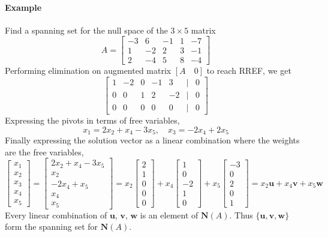 \documentclass[../linear-algebra.tex]{subfiles}
\begin{document}
\paragraph{Example}
Find a spanning set for the null space of the $3 \times 5$ matrix
\[A = \begin{bmatrix} -3 & 6 & -1 & 1 & -7 \\ 1 & -2 & 2 & 3 & -1 \\ 2 & -4 & 5 & 8 & -4 \end{bmatrix}\]
Performing elimination on augmented matrix $[A \quad 0]$ to reach RREF, we get
\[\begin{bmatrix} 1 & -2 & 0 & -1 & 3 & \big| & 0 \\ 0 & 0 & 1 & 2 & -2 & \big| & 0 \\ 0 & 0 & 0 & 0 & 0 & \big| & 0 \end{bmatrix}\]
Expressing the pivots in terms of free variables,
\[x_1 = 2x_2 + x_4 - 3x_5, \quad x_3 = -2x_4 + 2x_5\]
Finally expressing the solution vector as a linear combination where the weights are the free variables,
\[\begin{bmatrix} x_1 \\ x_2 \\ x_3 \\ x_4 \\ x_5 \end{bmatrix} = \begin{bmatrix} 2x_2 + x_4 - 3x_5 \\ x_2 \\ -2x_4 + x_5 \\ x_4 \\ x_5 \end{bmatrix} = x_2 \begin{bmatrix} 2 \\ 1 \\ 0 \\ 0 \\ 0 \end{bmatrix} + x_4 \begin{bmatrix} 1 \\ 0 \\ -2 \\ 1 \\ 0 \end{bmatrix} + x_5 \begin{bmatrix} -3 \\ 0 \\ 2 \\ 0 \\ 1 \end{bmatrix} = x_2\mathbf{u} + x_4\mathbf{v} + x_5\mathbf{w}\]
Every linear combination of $\mathbf{u}$, $\mathbf{v}$, $\mathbf{w}$ is an element of $\mathbf{N}(A)$.
Thus $\{\mathbf{u}, \mathbf{v}, \mathbf{w}\}$ form the spanning set for $\mathbf{N}(A)$.
\end{document}
